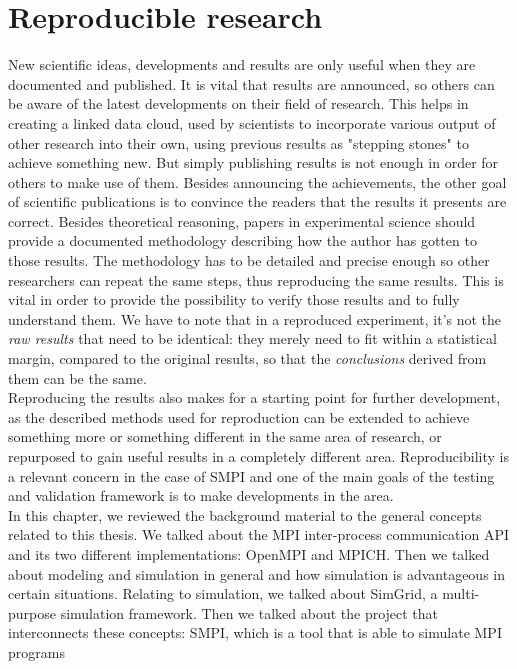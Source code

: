 \section{Reproducible research}
New scientific ideas, developments and results are only useful when
they are documented and published. It is vital that results are
announced, so others can be aware of the latest developments on their
field of research. This helps in creating a linked data cloud, used by
scientists to incorporate various output of other research into their
own, using previous results as "stepping stones" to achieve something
new.\cite{babbccrddg10} But simply publishing results is not enough in
order for others to make use of them. Besides announcing the
achievements, the other goal of scientific publications is to convince
the readers that the results it presents are correct. Besides
theoretical reasoning, papers in experimental science should provide a
documented methodology describing how the author has gotten to those
results.\cite{m10} The methodology has to be detailed and precise
enough so other researchers can repeat the same steps, thus
reproducing the same results. This is vital in order to provide the
possibility to verify those results and to fully understand
them. We have to note that in a reproduced experiment, it's not the
\emph{raw results} that need to be identical: they merely need to fit
within a statistical margin, compared to the original results, so that
the \emph{conclusions} derived from them can be the same.\\
Reproducing the results also makes for a starting point for
further development, as the described methods used for reproduction
can be extended to achieve something more or something different in
the same area of research, or repurposed to gain useful results in a
completely different area. Reproducibility is a relevant concern in
the case of SMPI and one of the main goals of the testing and
validation framework is to make developments in the area.\\[0.5cm]
In this chapter, we reviewed the background material to the general
concepts related to this thesis. We talked about the MPI inter-process
communication API and its two different implementations: OpenMPI and
MPICH. Then we talked about modeling and simulation in general and how
simulation is advantageous in certain situations. Relating to
simulation, we talked about SimGrid, a multi-purpose simulation
framework. Then we talked about the project that interconnects these
concepts: SMPI, which is a tool that is able to simulate MPI programs
